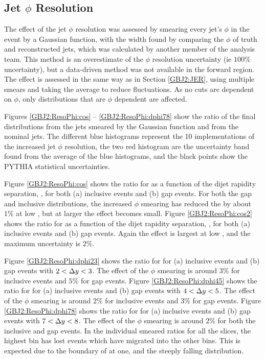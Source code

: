 \subsection{Jet $\phi{}$ Resolution}
\label{GBJ2:JPhiR}

The effect of the jet $\phi$ resolution was assessed by smearing every jet's $\phi$ in the event by a Gaussian function, with the width found by comparing the $\phi$ of truth and reconstructed jets, which was calculated by another member of the analysis team. 
This method is an overestimate of the $\phi$ resolution uncertainty (ie $100\%$ uncertainty), but a data-driven method was not available in the forward region.
The effect is assessed in the same way as in Section \ref{GBJ2:JER}, using multiple smears and taking the average to reduce fluctuations. 
As no cuts are dependent on $\phi$, only distributions that are $\phi$ dependent are affected.

Figures \ref{GBJ2:ResoPhi:cos} -- \ref{GBJ2:ResoPhi:dphi78} show the ratio of the final distributions from the jets smeared by the Gaussian function and from the nominal jets.
The different blue histograms represent the 10 implementations of the increased jet $\phi$ resolution, the two red histogram are the uncertainty band found from the average of the blue histograms, and the black points show the PYTHIA statistical uncertainties.

Figure \ref{GBJ2:ResoPhi:cos} shows the ratio for \mean{\cosdphi{}} as a function of the dijet rapidity separation, \dy{}, for both (a) inclusive events and (b) gap events.
For both the gap and inclusive distributions, the increased $\phi$ smearing has reduced the \mean{\cosdphi{}} by about $1\%$ at low \dy{}, but at larger \dy{} the effect becomes small.
Figure \ref{GBJ2:ResoPhi:cos2} shows the ratio for \mean{\costwodphi{}} as a function of the dijet rapidity separation, \dy{}, for both (a) inclusive events and (b) gap events.
Again the effect is largest at low \dy{}, and the maximum uncertainty is  $2\%$. 

Figure \ref{GBJ2:ResoPhi:dphi23} shows the ratio for \dphiDist{} for (a) inclusive events and (b) gap events with $2<\mbox{$\Delta y$}{}<3$.
The effect of the $\phi$ smearing is around  $3\%$ for inclusive events and  $5\%$ for gap events.
Figure \ref{GBJ2:ResoPhi:dphi45} shows the ratio for \dphiDist{} for (a) inclusive events and (b) gap events with $4<\mbox{$\Delta y$}{}<5$.
The effect of the $\phi$ smearing is around  $2\%$ for inclusive events and  $3\%$ for gap events.
Figure \ref{GBJ2:ResoPhi:dphi78} shows the ratio for \dphiDist{} for (a) inclusive events and (b) gap events with $7<\mbox{$\Delta y$}{}<8$.
The effect of the $\phi$ smearing is around  $2\%$ for both the inclusive and gap events.
In the \dphi{} individual smeared ratios for all the \dy{} slices, the highest \dphi{} bin has lost events which have migrated into the other \dphi{} bins. 
This is expected due to the boundary of \dphi{} at one, and the steeply falling \dphi{} distribution.


